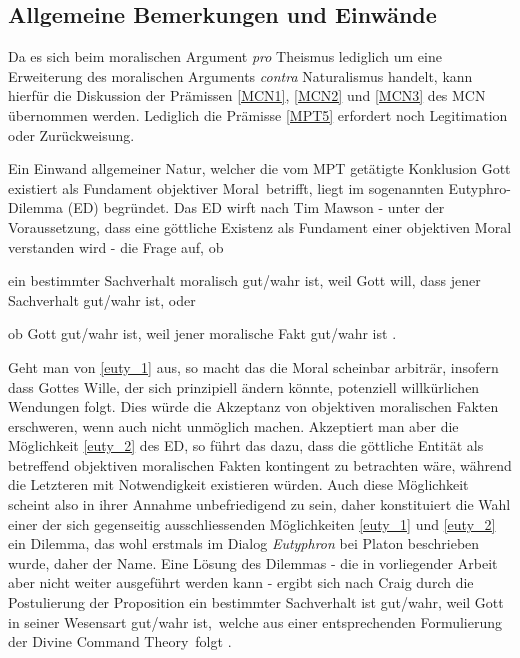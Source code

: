\documentclass[a4paper,11pt]{article}
\numberwithin{equation}{section}
\begin{document}
\subsection{Allgemeine Bemerkungen und Einwände}
Da es sich beim moralischen Argument \textit{pro} Theismus lediglich um eine Erweiterung des moralischen Arguments \textit{contra} Naturalismus handelt, kann hierfür die Diskussion der Prämissen \ref{MCN1}, \ref{MCN2} und \ref{MCN3} des MCN übernommen werden. Lediglich die Prämisse \ref{MPT5} erfordert noch Legitimation oder Zurückweisung.

Ein Einwand allgemeiner Natur, welcher die vom MPT getätigte Konklusion \flqq Gott existiert als Fundament objektiver Moral\frqq\ betrifft, liegt im sogenannten Eutyphro-Dilemma (ED) begründet. Das ED wirft nach Tim Mawson - unter der Voraussetzung, dass eine göttliche Existenz als Fundament einer objektiven Moral verstanden wird - die Frage auf, ob \begin{enumerate*}
\item \label{euty_1} ein bestimmter Sachverhalt moralisch gut/wahr ist, weil Gott will, dass jener Sachverhalt gut/wahr ist, oder \item \label{euty_2} ob Gott gut/wahr ist, weil jener moralische Fakt gut/wahr ist \cite[S. 1034]{Mawson.2009}. \end{enumerate*} Geht man von \ref{euty_1} aus, so macht das die Moral scheinbar arbiträr, insofern dass Gottes Wille, der sich prinzipiell ändern könnte, potenziell willkürlichen Wendungen folgt. Dies würde die Akzeptanz von objektiven moralischen Fakten erschweren, wenn auch nicht unmöglich machen. Akzeptiert man aber die Möglichkeit \ref{euty_2} des ED, so führt das dazu, dass die göttliche Entität als betreffend objektiven moralischen Fakten kontingent zu betrachten wäre, während die Letzteren mit Notwendigkeit existieren würden. Auch diese Möglichkeit scheint also in ihrer Annahme unbefriedigend zu sein, daher konstituiert die Wahl einer der sich gegenseitig ausschliessenden Möglichkeiten \ref{euty_1} und \ref{euty_2} ein Dilemma, das wohl erstmals im Dialog \textit{Eutyphron} bei Platon beschrieben wurde, daher der Name. Eine Lösung des Dilemmas - die in vorliegender Arbeit aber nicht weiter ausgeführt werden kann - ergibt sich nach Craig durch die Postulierung der Proposition \flqq ein bestimmter Sachverhalt ist gut/wahr, weil Gott in seiner Wesensart gut/wahr ist\frqq,\ welche aus einer entsprechenden Formulierung der \flqq Divine Command Theory\frqq\ folgt \cite[S. 181-183]{Craig.2009}. 
\end{document}
